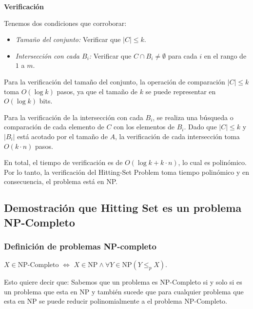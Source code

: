 \documentclass{estilo}
\begin{document}
\newline
\newline

\textbf{Verificación}

\hspace{0.5cm} Tenemos dos condiciones que corroborar:


\begin{itemize}
    \item \textit{Tamaño del conjunto:} Verificar que $|C| \leq k$.
    \item \textit{Intersección con cada $B_i$:} Verificar que $C \cap B_i \neq \emptyset$ para cada $i$ en el rango de $1$ a $m$.
\end{itemize}

\hspace{0.5cm} Para la verificación del tamaño del conjunto, la operación de comparación $|C| \leq k$ toma $O(\log k)$ pasos, ya que el tamaño de $k$ se puede representar en $O(\log k)$ bits.

\hspace{0.5cm} Para la verificación de la intersección con cada $B_i$, se realiza una búsqueda o comparación de cada elemento de $C$ con los elementos de $B_i$. Dado que $|C| \leq k$ y $|B_i|$ está acotado por el tamaño de $A$, la verificación de cada intersección toma $O(k \cdot n)$ pasos.

\hspace{0.5cm} En total, el tiempo de verificación es de $O(\log k + k \cdot n)$, lo cual es polinómico. Por lo tanto, la verificación del Hitting-Set Problem toma tiempo polinómico y en consecuencia, el problema está en NP.


\subsection{Demostración que Hitting Set es un problema NP-Completo}

\subsubsection{Definición de problemas NP-completo}

\(X \in \text{NP-Completo}\) \(\Leftrightarrow\) \(X \in \text{NP} \land \forall Y \in \text{NP} (Y \leq_p X)\).

Esto quiere decir que: Sabemos que un problema es NP-Completo si y solo si es un problema que esta en NP y también sucede que para cualquier problema que esta en NP se puede reducir polinomialmente a el problema NP-Completo.
\end{document}
